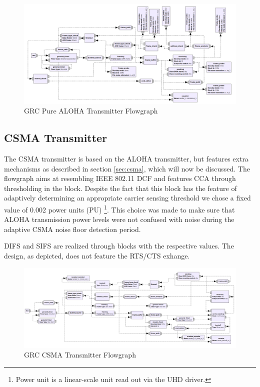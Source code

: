 \begin{figure}
	\label{fig:grc-aloha-sender}
	\begin{center}
		\includegraphics[width=\textwidth]{pictures/grc_aloha_transmitter_flowgraph}
\end{center}
\caption{GRC Pure ALOHA Transmitter Flowgraph}
\end{figure}

\subsection{CSMA Transmitter}

The CSMA transmitter is based on the ALOHA transmitter, but features extra mechanisms as described in section \ref{sec:csma}, which will now be discussed. The flowgraph aims at resembling IEEE 802.11 DCF and features CCA through thresholding in the  block. Despite the fact that this block has the feature of adaptively determining an appropriate carrier sensing threshold we chose a fixed value of 0.002 power units (PU) \footnote{Power unit is a linear-scale unit read out via the UHD driver.}. This choice was made to make sure that ALOHA transmission power levels were not confused with noise during the adaptive CSMA noise floor detection period. 

DIFS and SIFS are realized through  blocks with the respective values. The design, as depicted, does not feature the RTS/CTS exhange.

\begin{figure}
	\label{fig:grc-csma-sender}
	\begin{center}
		\includegraphics[width=\textwidth]{pictures/grc_csma_transmitter_flowgraph}
\end{center}
\caption{GRC CSMA Transmitter Flowgraph}
\end{figure}

